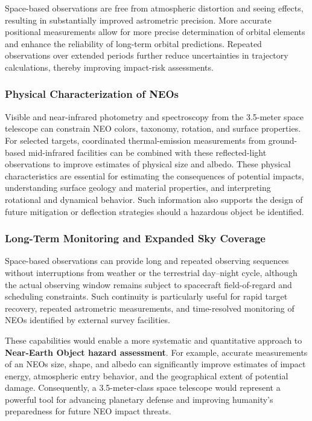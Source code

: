 Space-based observations are free from atmospheric distortion and seeing effects, resulting in substantially improved astrometric precision. More accurate positional measurements allow for more precise determination of orbital elements and enhance the reliability of long-term orbital predictions. Repeated observations over extended periods further reduce uncertainties in trajectory calculations, thereby improving impact-risk assessments.

\subsubsection{Physical Characterization of NEOs}\label{physical-characterization-of-neos}

Visible and near-infrared photometry and spectroscopy from the 3.5-meter space telescope can constrain NEO colors, taxonomy, rotation, and surface properties. For selected targets, coordinated thermal-emission measurements from ground-based mid-infrared facilities can be combined with these reflected-light observations to improve estimates of physical size and albedo. These physical characteristics are essential for estimating the consequences of potential impacts, understanding surface geology and material properties, and interpreting rotational and dynamical behavior. Such information also supports the design of future mitigation or deflection strategies should a hazardous object be identified.

\subsubsection{Long-Term Monitoring and Expanded Sky Coverage}\label{long-term-monitoring-and-expanded-sky-coverage}

Space-based observations can provide long and repeated observing sequences
without interruptions from weather or the terrestrial day--night cycle,
although the actual observing window remains subject to spacecraft
field-of-regard and scheduling constraints. Such continuity is particularly
useful for rapid target recovery, repeated astrometric measurements, and
time-resolved monitoring of NEOs identified by external survey facilities.

These capabilities would enable a more systematic and quantitative approach to \textbf{Near-Earth Object hazard assessment}. For example, accurate measurements of an NEO\textquotesingle s size, shape, and albedo can significantly improve estimates of impact energy, atmospheric entry behavior, and the geographical extent of potential damage. Consequently, a 3.5-meter-class space telescope would represent a powerful tool for advancing planetary defense and improving humanity's preparedness for future NEO impact threats.

